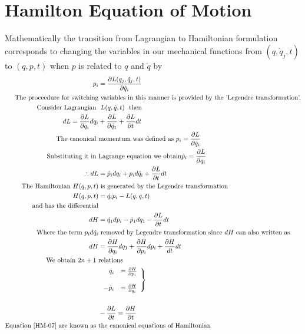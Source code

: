 \section{Hamilton Equation of Motion}
Mathematically the transition from Lagrangian to Hamiltonian formulation corresponds to changing the variables in our mechanical functions from $(q, \dot{q}_j,t)$ to $(q,p,t)$ when $p$ is related to $q$ and $\dot{q}$ by
\begin{align}
p_i&=\frac{\partial L(q_j,\dot{q}_j,t)}{\partial \dot{q}_i}\\
\text{The proceedure for switching}&\text{ variables in this manner is provided by the 'Legendre  transformation'.}\\
\text{Consider Lagrangian }&\ L(q,\dot{q},t)\ \text{ then}\notag\\
dL=\frac{\partial L}{\partial q_i}dq_i&+\frac{\partial L}{\partial \dot{q}_1}+\frac{\partial L}{\partial t}dt\\
\text{The canonical }&\text{momentum  was defined as }p_i=\frac{\partial L}{\partial \dot{q}_i}\notag\\
\text{Substituting it in }&\text{Lagrange equation we obtain}
\dot{p}_i=\frac{\partial L}{\partial {q}_i}\notag\\
\therefore dL&=\dot{p}_idq_i+p_id\dot{q}_i+\frac{\partial L}{\partial t}dt\\
\text{The Hamiltonian $H(q,p,t)$}&\text{ is generated by the Legendre transformation}\\
H(q,p,t)&=\dot{q}_ip_i-L(q,\dot{q},t)\\
\text{and has the differential}\\
dH&=\dot{q}_1dp_i-\dot{p}_1dq_1-\frac{\partial L}{\partial t}dt\\
\text{Where the term $p_id\dot{q}_i$}&\text{ removed by Legendre transformation since $dH$ can also written as }\\
dH&=\frac{\partial H}{\partial q_i}dq_1+\frac{\partial H}{\partial p_i}dp_i+\frac{\partial H}{dt}dt\\
\text{We obtain $2n+1$ }&\text{relations}\\
&\left.\begin{array}{rl}\dot{q}_{i} & =\frac{\partial H}{\partial p_{i}} \label{HM-07}\\\\ -\dot{p}_{i} & =\frac{\partial H}{\partial q_{i}}\end{array}\right\}\\\notag\\
&-\frac{\partial L}{\partial t}=\frac{\partial H}{\partial t}\notag\\
\text{Equation $\ref{HM-07}$ are known as }&\text{the canonical  equations of Hamiltonian}\notag
\end{align}

